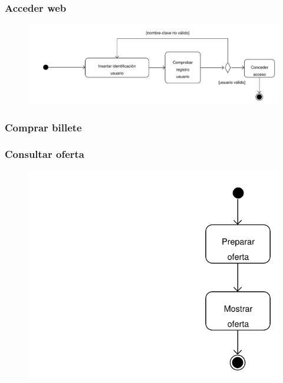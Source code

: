 \documentclass[11pt, a4paper, twoside, titlepage]{article}
\begin{document}
			\subsubsection{Acceder web}
				\begin{figure}[H]\centering
					\includegraphics[scale=.67]{diagramas/da_accederweb.pdf}
				\end{figure}

			\subsubsection{Comprar billete}
				\begin{figure}[H]\centering
				\end{figure}

			\subsubsection{Consultar oferta}
				\begin{figure}[H]\centering
					\includegraphics[scale=.7]{diagramas/da_consultaroferta.pdf}
				\end{figure}
\end{document}
